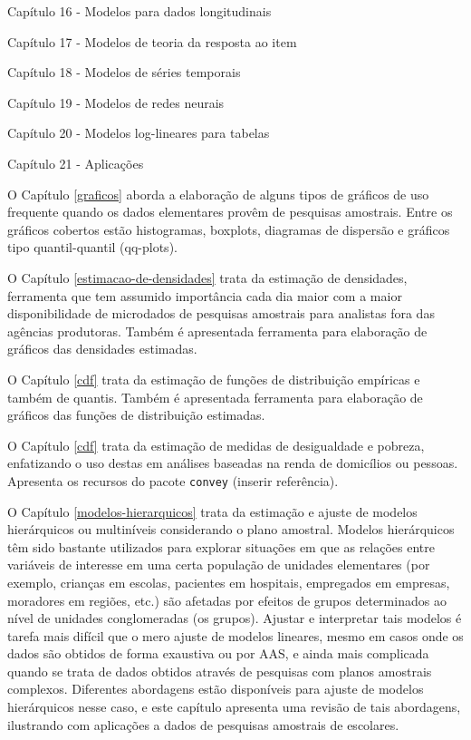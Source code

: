 \documentclass[
  12pt,
  brazilian,
]{book}
\theoremstyle{definition}
\theoremstyle{definition}
\theoremstyle{definition}
\theoremstyle{definition}
\theoremstyle{remark}
\begin{document}
Capítulo 16 - Modelos para dados longitudinais

Capítulo 17 - Modelos de teoria da resposta ao item

Capítulo 18 - Modelos de séries temporais

Capítulo 19 - Modelos de redes neurais

Capítulo 20 - Modelos log-lineares para tabelas

Capítulo 21 - Aplicações

O Capítulo \ref{graficos} aborda a elaboração de alguns tipos de gráficos de uso frequente quando os dados elementares provêm de pesquisas amostrais. Entre os gráficos cobertos estão histogramas, boxplots, diagramas de dispersão e gráficos tipo quantil-quantil (qq-plots).

O Capítulo \ref{estimacao-de-densidades} trata da estimação de densidades, ferramenta que tem assumido importância cada dia maior com a maior disponibilidade de microdados de pesquisas amostrais para analistas fora das agências produtoras. Também é apresentada ferramenta para elaboração de gráficos das densidades estimadas.

O Capítulo \ref{cdf} trata da estimação de funções de distribuição empíricas e também de quantis. Também é apresentada ferramenta para elaboração de gráficos das funções de distribuição estimadas.

O Capítulo \ref{cdf} trata da estimação de medidas de desigualdade e pobreza, enfatizando o uso destas em análises baseadas na renda de domicílios ou pessoas. Apresenta os recursos do pacote \texttt{convey} (inserir referência).

O Capítulo \ref{modelos-hierarquicos} trata da estimação e ajuste de modelos hierárquicos ou multiníveis considerando o plano amostral. Modelos hierárquicos têm sido bastante utilizados para explorar situações em que as relações entre variáveis de interesse em uma certa população de unidades elementares (por exemplo, crianças em escolas, pacientes em hospitais, empregados em empresas, moradores em regiões, etc.) são afetadas por efeitos de grupos determinados ao nível de unidades conglomeradas (os grupos). Ajustar e interpretar tais modelos é tarefa mais difícil que o mero ajuste de modelos lineares, mesmo em casos onde os dados são obtidos de forma exaustiva ou por AAS, e ainda mais complicada quando se trata de dados obtidos através de pesquisas com planos amostrais complexos. Diferentes abordagens estão disponíveis para ajuste de modelos hierárquicos nesse caso, e este capítulo apresenta uma revisão de tais abordagens, ilustrando com aplicações a dados de pesquisas amostrais de escolares.
\end{document}

